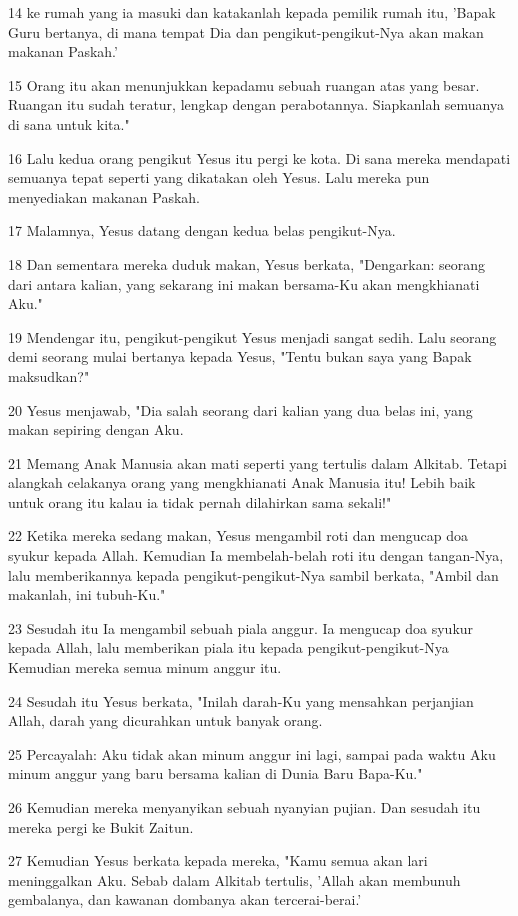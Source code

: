 \par 14 ke rumah yang ia masuki dan katakanlah kepada pemilik rumah itu, 'Bapak Guru bertanya, di mana tempat Dia dan pengikut-pengikut-Nya akan makan makanan Paskah.'
\par 15 Orang itu akan menunjukkan kepadamu sebuah ruangan atas yang besar. Ruangan itu sudah teratur, lengkap dengan perabotannya. Siapkanlah semuanya di sana untuk kita."
\par 16 Lalu kedua orang pengikut Yesus itu pergi ke kota. Di sana mereka mendapati semuanya tepat seperti yang dikatakan oleh Yesus. Lalu mereka pun menyediakan makanan Paskah.
\par 17 Malamnya, Yesus datang dengan kedua belas pengikut-Nya.
\par 18 Dan sementara mereka duduk makan, Yesus berkata, "Dengarkan: seorang dari antara kalian, yang sekarang ini makan bersama-Ku akan mengkhianati Aku."
\par 19 Mendengar itu, pengikut-pengikut Yesus menjadi sangat sedih. Lalu seorang demi seorang mulai bertanya kepada Yesus, "Tentu bukan saya yang Bapak maksudkan?"
\par 20 Yesus menjawab, "Dia salah seorang dari kalian yang dua belas ini, yang makan sepiring dengan Aku.
\par 21 Memang Anak Manusia akan mati seperti yang tertulis dalam Alkitab. Tetapi alangkah celakanya orang yang mengkhianati Anak Manusia itu! Lebih baik untuk orang itu kalau ia tidak pernah dilahirkan sama sekali!"
\par 22 Ketika mereka sedang makan, Yesus mengambil roti dan mengucap doa syukur kepada Allah. Kemudian Ia membelah-belah roti itu dengan tangan-Nya, lalu memberikannya kepada pengikut-pengikut-Nya sambil berkata, "Ambil dan makanlah, ini tubuh-Ku."
\par 23 Sesudah itu Ia mengambil sebuah piala anggur. Ia mengucap doa syukur kepada Allah, lalu memberikan piala itu kepada pengikut-pengikut-Nya Kemudian mereka semua minum anggur itu.
\par 24 Sesudah itu Yesus berkata, "Inilah darah-Ku yang mensahkan perjanjian Allah, darah yang dicurahkan untuk banyak orang.
\par 25 Percayalah: Aku tidak akan minum anggur ini lagi, sampai pada waktu Aku minum anggur yang baru bersama kalian di Dunia Baru Bapa-Ku."
\par 26 Kemudian mereka menyanyikan sebuah nyanyian pujian. Dan sesudah itu mereka pergi ke Bukit Zaitun.
\par 27 Kemudian Yesus berkata kepada mereka, "Kamu semua akan lari meninggalkan Aku. Sebab dalam Alkitab tertulis, 'Allah akan membunuh gembalanya, dan kawanan dombanya akan tercerai-berai.'
